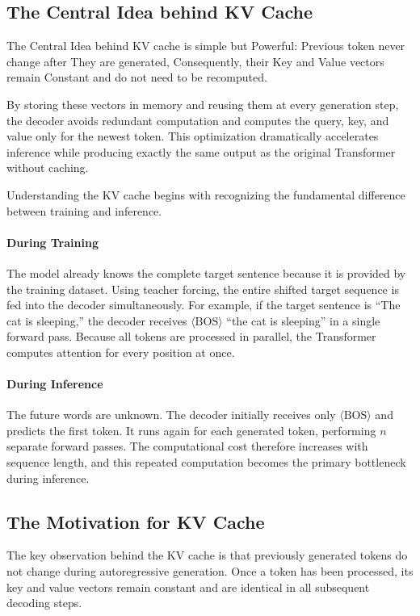 \subsection{The Central Idea behind KV Cache}

The Central Idea behind KV cache is simple but Powerful: Previous token never change after They are generated, Consequently, their Key and Value vectors remain Constant and do not need to be recomputed.

By storing these vectors in memory and reusing them at every generation step, the decoder avoids redundant computation and computes the query, key, and value only for the newest token. This optimization dramatically accelerates inference while producing exactly the same output as the original Transformer without caching.

Understanding the KV cache begins with recognizing the fundamental difference between training and inference.

\paragraph{During Training}
The model already knows the complete target sentence because it is provided by the training dataset. Using teacher forcing, the entire shifted target sequence is fed into the decoder simultaneously. For example, if the target sentence is ``The cat is sleeping,'' the decoder receives $\langle \text{BOS} \rangle$ ``the cat is sleeping'' in a single forward pass. Because all tokens are processed in parallel, the Transformer computes attention for every position at once.

\paragraph{During Inference}
The future words are unknown. The decoder initially receives only $\langle \text{BOS} \rangle$ and predicts the first token. It runs again for each generated token, performing $n$ separate forward passes. The computational cost therefore increases with sequence length, and this repeated computation becomes the primary bottleneck during inference.

\subsection{The Motivation for KV Cache}

The key observation behind the KV cache is that previously generated tokens do not change during autoregressive generation. Once a token has been processed, its key and value vectors remain constant and are identical in all subsequent decoding steps.

